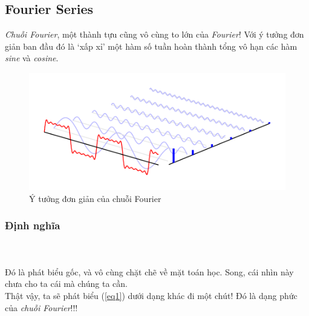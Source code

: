 \documentclass{article}
\begin{document}
    \subsection{Fourier Series}
    \textit{Chuỗi Fourier}, một thành tựu cũng vô cùng to lớn của \textit{Fourier}! Với ý tưởng đơn giản ban đầu đó là `xấp xỉ' một hàm số tuần hoàn thành tổng vô hạn các hàm \textit{sine} và \textit{cosine}.
    \begin{figure}[ht!]
        \centering
        \includegraphics[width = 0.7\linewidth]{fourier-series.png}
        \caption{Ý tưởng đơn giản của chuỗi Fourier}
        \label{fig2}
     \end{figure}
        \subsubsection{Định nghĩa}
        \\ \\
        Đó là phát biểu gốc, và vô cùng chặt chẽ về mặt toán học. Song, cái nhìn này chưa cho ta cái mà chúng ta cần.\\
        Thật vậy, ta sẽ phát biểu (\ref{eq1}) dưới dạng khác đi một chút! Đó là dạng phức của \textit{chuỗi Fourier}!!! 
\end{document}
